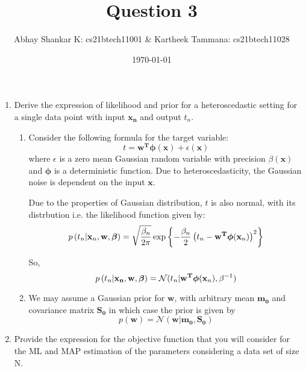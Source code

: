 \documentclass[reqno]{amsart}
\begin{document}
    \title{Question 3}
    \author{Abhay Shankar K: cs21btech11001 \& Kartheek Tammana: cs21btech11028}
    \date{\today}
    \maketitle

    \begin{enumerate}[label=\textbf{(\Roman*)}]
        \item \question Derive the expression of likelihood and prior for a heteroscedastic setting for a single data point with input \(\mathbf{x_n}\) and output \(t_n\).
        
        \solution
        \begin{enumerate}[label=\textbf{(\alph*)}]
            \item Consider the following formula for the target variable:
            \[t = \mathbf{w^T} \boldsymbol{\phi}(\mathbf{x}) + \epsilon(\mathbf{x})\] where \(\epsilon\) is a zero mean Gaussian random variable with precision \(\beta(\mathbf{x})\) and \(\boldsymbol{\phi}\) is a deterministic function. 
            Due to heteroscedasticity, the Gaussian noise is dependent on the input \(\mathbf{x}\). 
            
            Due to the properties of Gaussian distribution, \(t\) is also normal, with its distrbution i.e. the likelihood function given by:
            \begin{equation}
                p\left(t_n | \mathbf{x}_n, \mathbf{w}, \boldsymbol{\beta}\right) 
                = 
                \sqrt{\frac{\beta_n}{2\pi}} \exp \left\{- \frac{\beta_n}{2} \left(t_n - \mathbf{w^T} \boldsymbol{\phi}(\mathbf{x}_n)\right)^2\right\}
                \label{eq:likelihood}
            \end{equation}
    
            So, 
            \[p\left(t_n | \mathbf{x_n}, \mathbf{w}, \boldsymbol{\beta}\right) = \mathcal{N} (t_n | \mathbf{w^T} \boldsymbol{\phi}(\mathbf{x}_n), \beta^{-1})\]
            \item We may assume a Gaussian prior for \(\mathbf{w}\), with arbitrary mean \(\mathbf{m_0}\) and covariance matrix \(\mathbf{S_0}\) in which case the prior is given by
        \[p(\mathbf{w}) = \mathcal{N}(\mathbf{w} | \mathbf{m_0}, \mathbf{S_0})\]

        \end{enumerate}

        \item \question Provide the expression for the objective function that you will consider for the ML and MAP estimation of the parameters considering a data set of size N.


\end{enumerate}
\end{document}
